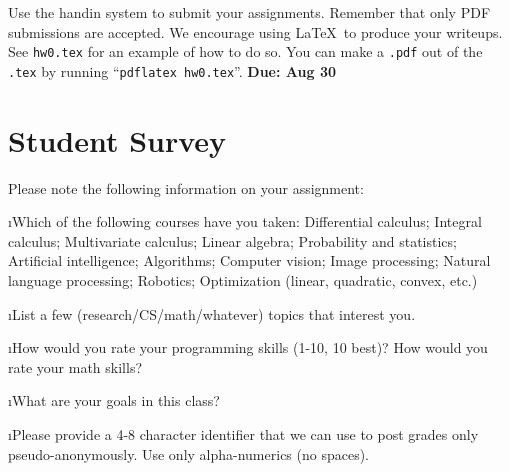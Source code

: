 \documentclass[fleqn]{article}
\begin{document}


Use the handin system to submit your assignments. Remember that only 
PDF submissions are accepted.  We encourage using
\LaTeX\ to produce your writeups.  See \verb+hw0.tex+ for an example
of how to do so.  You can make a \verb+.pdf+ out of the \verb+.tex+ by
running ``\verb+pdflatex hw0.tex+''. \textbf{Due: Aug 30}

\section{Student Survey}

Please note the following information on your assignment:

\bee
\i Which of the following courses have you taken:
     Differential calculus;
     Integral calculus;
     Multivariate calculus;
     Linear algebra;
     Probability and statistics;
     Artificial intelligence;
     Algorithms;
     Computer vision;
     Image processing;
     Natural language processing;
     Robotics;
     Optimization (linear, quadratic, convex, etc.)



\i List a few (research/CS/math/whatever) topics that interest you.


\i How would you rate your programming skills (1-10, 10 best)?  How would you rate your math skills?

% 

\i What are your goals in this class?


\i Please provide a 4-8 character identifier that we can use to post
grades only pseudo-anonymously.  Use only alpha-numerics (no spaces).
\end{document}
